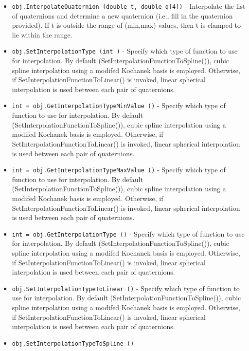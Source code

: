 \begin{itemize}
\item  \verb|obj.InterpolateQuaternion (double t, double q[4])| -  Interpolate the list of quaternions and determine a new quaternion
 (i.e., fill in the quaternion provided). If t is outside the range of
 (min,max) values, then t is clamped to lie within the range. 

\item  \verb|obj.SetInterpolationType (int )| -  Specify which type of function to use for interpolation. By default
 (SetInterpolationFunctionToSpline()), cubic spline interpolation using a
 modifed Kochanek basis is employed. Otherwise, if
 SetInterpolationFunctionToLinear() is invoked, linear spherical interpolation
 is used between each pair of quaternions.

\item  \verb|int = obj.GetInterpolationTypeMinValue ()| -  Specify which type of function to use for interpolation. By default
 (SetInterpolationFunctionToSpline()), cubic spline interpolation using a
 modifed Kochanek basis is employed. Otherwise, if
 SetInterpolationFunctionToLinear() is invoked, linear spherical interpolation
 is used between each pair of quaternions.

\item  \verb|int = obj.GetInterpolationTypeMaxValue ()| -  Specify which type of function to use for interpolation. By default
 (SetInterpolationFunctionToSpline()), cubic spline interpolation using a
 modifed Kochanek basis is employed. Otherwise, if
 SetInterpolationFunctionToLinear() is invoked, linear spherical interpolation
 is used between each pair of quaternions.

\item  \verb|int = obj.GetInterpolationType ()| -  Specify which type of function to use for interpolation. By default
 (SetInterpolationFunctionToSpline()), cubic spline interpolation using a
 modifed Kochanek basis is employed. Otherwise, if
 SetInterpolationFunctionToLinear() is invoked, linear spherical interpolation
 is used between each pair of quaternions.

\item  \verb|obj.SetInterpolationTypeToLinear ()| -  Specify which type of function to use for interpolation. By default
 (SetInterpolationFunctionToSpline()), cubic spline interpolation using a
 modifed Kochanek basis is employed. Otherwise, if
 SetInterpolationFunctionToLinear() is invoked, linear spherical interpolation
 is used between each pair of quaternions.

\item  \verb|obj.SetInterpolationTypeToSpline ()|

\end{itemize}
